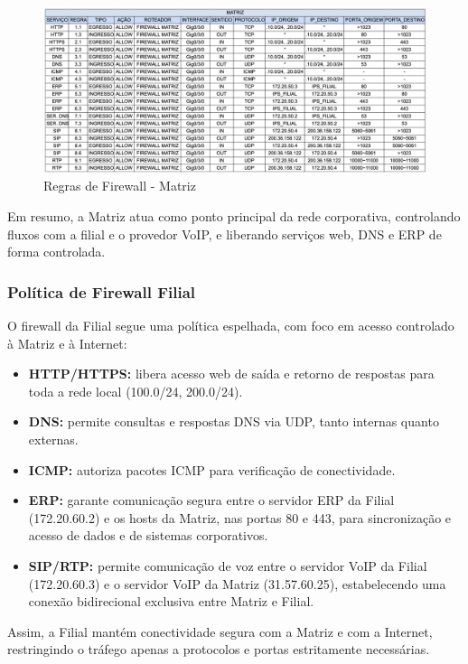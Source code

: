 \documentclass[a4paper, 12pt]{article}
\begin{document}
\begin{figure}
    \centering
    \includegraphics[width=1\linewidth]{tabela-matriz.png}
    \caption{Regras de Firewall - Matriz}
    \label{fig:placeholder}
\end{figure}

Em resumo, a Matriz atua como ponto principal da rede corporativa, controlando fluxos com a filial e o provedor VoIP, e liberando serviços web, DNS e ERP de forma controlada.

\subsubsection{Política de Firewall Filial}

O firewall da Filial segue uma política espelhada, com foco em acesso controlado à Matriz e à Internet:

\begin{itemize}
    \item \textbf{HTTP/HTTPS:} libera acesso web de saída e retorno de respostas para toda a rede local (100.0/24, 200.0/24).
    \item \textbf{DNS:} permite consultas e respostas DNS via UDP, tanto internas quanto externas.
    \item \textbf{ICMP:} autoriza pacotes ICMP para verificação de conectividade.
    \item \textbf{ERP:} garante comunicação segura entre o servidor ERP da Filial (172.20.60.2) e os hosts da Matriz, nas portas 80 e 443, para sincronização e acesso de dados e de sistemas corporativos.
    \item \textbf{SIP/RTP:} permite comunicação de voz entre o servidor VoIP da Filial (172.20.60.3) e o servidor VoIP da Matriz (31.57.60.25), estabelecendo uma conexão bidirecional exclusiva entre Matriz e Filial.
\end{itemize}

Assim, a Filial mantém conectividade segura com a Matriz e com a Internet, restringindo o tráfego apenas a protocolos e portas estritamente necessárias.
\end{document}
